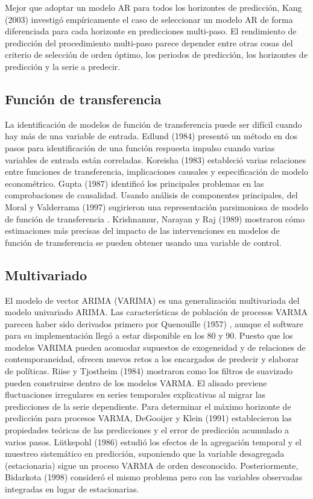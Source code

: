 \documentclass{llncs}
\begin{document}
Mejor que adoptar un modelo AR para todos los horizontes de predicción, Kang (2003) investigó empíricamente el caso de seleccionar un modelo AR  de forma diferenciada para cada horizonte en predicciones multi-paso.
El rendimiento de predicción del procedimiento multi-paso parece depender entre otras cosas del criterio de selección de orden óptimo, los periodos de predicción, los horizontes de predicción y la serie a predecir.


\subsection{Función de transferencia}
La identificación de modelos de función de transferencia puede ser difícil cuando hay más de una variable de entrada. Edlund (1984) \cite{Edlund1984297} presentó un método en dos pasos para identificación de una función respuesta impulso cuando varias variables de entrada están correladas. Koreisha (1983) \cite{-} estableció varias relaciones entre funciones de transferencia, implicaciones causales y especificación de modelo econométrico. Gupta (1987) \cite{Gupta1987195} identificó los principales problemas en las comprobaciones de causalidad. Usando análisis de componentes principales, del Moral y Valderrama (1997) \cite{-} sugirieron una representación parsimoniosa de  modelo de función de transferencia . Krishnamur, Narayan y Raj (1989) \cite{-} mostraron cómo estimaciones más precisas del impacto de las intervenciones en modelos de función de transferencia se pueden obtener usando una variable de control.

\subsection{Multivariado}
El modelo de vector ARIMA (VARIMA) es una generalización multivariada del modelo univariado ARIMA. Las características de población de procesos VARMA parecen haber sido derivados primero por Quenouille (1957) \cite{-}, aunque el software para su implementación llegó a estar disponible en los 80 y 90. Puesto que los modelos VARIMA pueden acomodar supuestos de exogeneidad y de relaciones de contemporaneidad, ofrecen nuevos retos a los encargados de predecir y elaborar de políticas. Riise y Tjostheim (1984) \cite{-} mostraron como los filtros de suavizado pueden construirse dentro de los modelos VARMA. El alisado previene fluctuaciones irregulares en series temporales explicativas al migrar las predicciones de la serie dependiente. Para determinar el máximo horizonte de predicción para procesos VARMA, DeGooijer y Klein (1991) \cite{-} establecieron las propiedades teóricas de las predicciones y el error de predicción acumulado a varios pasos. Lütkepohl (1986) \cite{-} estudió los efectos de la agregación temporal y el muestreo sistemático en predicción, suponiendo que la variable desagregada (estacionaria) sigue un proceso VARMA de orden desconocido. Posteriormente, Bidarkota (1998) \cite{-} consideró el mismo problema pero con las variables observadas integradas en lugar de estacionarias.
\end{document}
